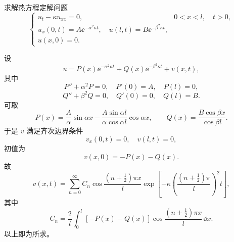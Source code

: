 \begin{question}
求解热方程定解问题
\[
\begin{cases}
u_t-\kappa u_{xx}=0,&0<x<l,
\quad t>0,\\
u_x(0,t)=A \ee^{-\alpha^2\kappa t},
\quad u(l,t)=B \ee^{-\beta^2\kappa t},\\
u(x,0)=0.
\end{cases}
\]
\begin{solution}
设
\[
u=P(x)\ee^{-\alpha^2\kappa t}+Q(x)\ee^{-\beta^2\kappa t}+v(x,t),
\]
其中
\[
P''+\alpha^2P=0,
\quad P'(0)=A,
\quad P(l)=0,
\]
\[
Q''+\beta^2Q=0,
\quad Q'(0)=0,
\quad Q(l)=B.
\]
可取
\[
P(x)=\frac{A}{\alpha}\sin\alpha x
-\frac{A\sin\alpha l}{\alpha\cos\alpha l}\cos\alpha x,
\qquad
Q(x)=\frac{B\cos\beta x}{\cos\beta l}.
\]
于是 \(v\) 满足齐次边界条件
\[
v_x(0,t)=0,
\quad v(l,t)=0,
\]
初值为
\[
v(x,0)=-P(x)-Q(x).
\]
故
\[
v(x,t)=\sum_{n=0}^{\infty}C_n
\cos\frac{(n+\frac12)\pi x}{l}
\exp\left[-\kappa\left(\frac{(n+\frac12)\pi}{l}\right)^2t\right],
\]
其中
\[
C_n=\frac2l\int_0^l[-P(x)-Q(x)]
\cos\frac{(n+\frac12)\pi x}{l}\,\dd{x}.
\]
以上即为所求。
\end{solution}
\end{question}

